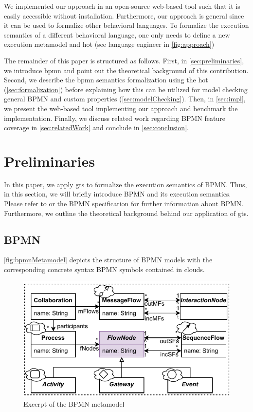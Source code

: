 \documentclass[runningheads]{llncs}
\begin{document}
We implemented our approach in an open-source web-based tool such that it is easily accessible without installation.
Furthermore, our approach is general since it can be used to formalize other behavioral languages.
To formalize the execution semantics of a different behavioral language, one only needs to define a new execution metamodel and \gls*{hot} (see language engineer in \autoref{fig:approach})

The remainder of this paper is structured as follows.
First, in \autoref{sec:preliminaries}, we introduce \gls*{bpmn} and point out the theoretical background of this contribution.
Second, we describe the \gls*{bpmn} semantics formalization using the \gls*{hot} (\autoref{sec:formalization}) before explaining how this can be utilized for model checking general BPMN and custom properties (\autoref{sec:modelChecking}).
Then, in \autoref{sec:impl}, we present the web-based tool implementing our approach and benchmark the implementation.
Finally, we discuss related work regarding BPMN feature coverage in \autoref{sec:relatedWork} and conclude in \autoref{sec:conclusion}.

\section{Preliminaries} \label{sec:preliminaries}
In this paper, we apply \gls*{gt}s to formalize the execution semantics of BPMN.
Thus, in this section, we will briefly introduce BPMN and its execution semantics.
Please refer to \cite{freundRealLifeBPMNUsing2019} or the BPMN specification \cite{objectmanagementgroupBusinessProcessModel2013} for further information about BPMN.
Furthermore, we outline the theoretical background behind our application of \gls*{gt}s.
\subsection{BPMN}
\autoref{fig:bpmnMetamodel} depicts the structure of BPMN models with the corresponding concrete syntax BPMN symbols contained in clouds.

\begin{figure}[ht]
  \centering
  \includegraphics[width=0.7\linewidth]{images/bpmn_semantics-bpmn-metamodel.pdf}
  \caption{Excerpt of the BPMN metamodel \cite{objectmanagementgroupBusinessProcessModel2013}}
  \label{fig:bpmnMetamodel}
\end{figure}
\end{document}
